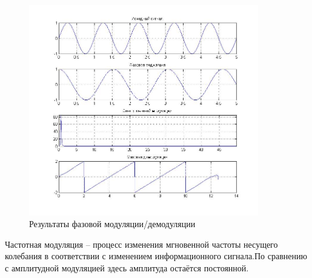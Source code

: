 \documentclass[10pt,a4paper]{article}
\begin{document}
\begin{figure}[h]\centering
	\includegraphics[width=10cm]{pm}
	\caption{Результаты фазовой модуляции/демодуляции}\label{fig.pm}
\end{figure}                                                                                                                                                                                                                                                                                                                                                                                                                                                                                                                                                                                                                                                                                                                                                                                                                                                                                                                                                                                                                                                                                                                                                                                                                                                                                                                                                                                                                                                                        
\FloatBarrier

Частотная модуляция – процесс изменения мгновенной частоты несущего колебания в соответствии с изменением информационного сигнала.По сравнению с амплитудной модуляцией здесь амплитуда остаётся постоянной.
\end{document}
